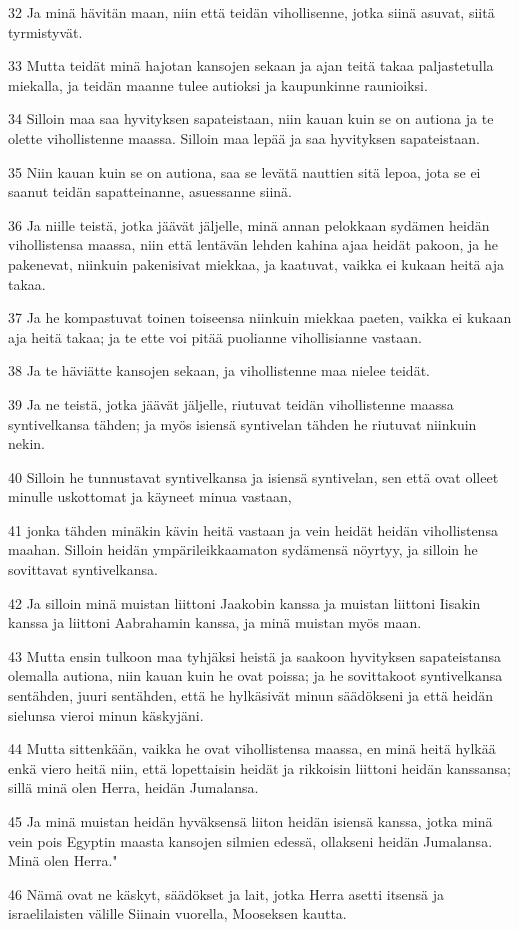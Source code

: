 \par 32 Ja minä hävitän maan, niin että teidän vihollisenne, jotka siinä asuvat, siitä tyrmistyvät.
\par 33 Mutta teidät minä hajotan kansojen sekaan ja ajan teitä takaa paljastetulla miekalla, ja teidän maanne tulee autioksi ja kaupunkinne raunioiksi.
\par 34 Silloin maa saa hyvityksen sapateistaan, niin kauan kuin se on autiona ja te olette vihollistenne maassa. Silloin maa lepää ja saa hyvityksen sapateistaan.
\par 35 Niin kauan kuin se on autiona, saa se levätä nauttien sitä lepoa, jota se ei saanut teidän sapatteinanne, asuessanne siinä.
\par 36 Ja niille teistä, jotka jäävät jäljelle, minä annan pelokkaan sydämen heidän vihollistensa maassa, niin että lentävän lehden kahina ajaa heidät pakoon, ja he pakenevat, niinkuin pakenisivat miekkaa, ja kaatuvat, vaikka ei kukaan heitä aja takaa.
\par 37 Ja he kompastuvat toinen toiseensa niinkuin miekkaa paeten, vaikka ei kukaan aja heitä takaa; ja te ette voi pitää puolianne vihollisianne vastaan.
\par 38 Ja te häviätte kansojen sekaan, ja vihollistenne maa nielee teidät.
\par 39 Ja ne teistä, jotka jäävät jäljelle, riutuvat teidän vihollistenne maassa syntivelkansa tähden; ja myös isiensä syntivelan tähden he riutuvat niinkuin nekin.
\par 40 Silloin he tunnustavat syntivelkansa ja isiensä syntivelan, sen että ovat olleet minulle uskottomat ja käyneet minua vastaan,
\par 41 jonka tähden minäkin kävin heitä vastaan ja vein heidät heidän vihollistensa maahan. Silloin heidän ympärileikkaamaton sydämensä nöyrtyy, ja silloin he sovittavat syntivelkansa.
\par 42 Ja silloin minä muistan liittoni Jaakobin kanssa ja muistan liittoni Iisakin kanssa ja liittoni Aabrahamin kanssa, ja minä muistan myös maan.
\par 43 Mutta ensin tulkoon maa tyhjäksi heistä ja saakoon hyvityksen sapateistansa olemalla autiona, niin kauan kuin he ovat poissa; ja he sovittakoot syntivelkansa sentähden, juuri sentähden, että he hylkäsivät minun säädökseni ja että heidän sielunsa vieroi minun käskyjäni.
\par 44 Mutta sittenkään, vaikka he ovat vihollistensa maassa, en minä heitä hylkää enkä viero heitä niin, että lopettaisin heidät ja rikkoisin liittoni heidän kanssansa; sillä minä olen Herra, heidän Jumalansa.
\par 45 Ja minä muistan heidän hyväksensä liiton heidän isiensä kanssa, jotka minä vein pois Egyptin maasta kansojen silmien edessä, ollakseni heidän Jumalansa. Minä olen Herra."
\par 46 Nämä ovat ne käskyt, säädökset ja lait, jotka Herra asetti itsensä ja israelilaisten välille Siinain vuorella, Mooseksen kautta.

